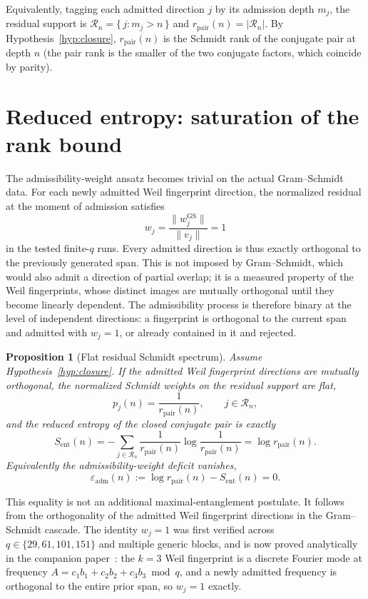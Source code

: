 \documentclass[11pt]{article}
\newtheorem{proposition}{Proposition}
\newcommand{\Sent}{S_{\mathrm{ent}}}
\newcommand{\rpair}{r_{\mathrm{pair}}}
\newcommand{\Rset}{\mathcal{R}}
\begin{document}
    Equivalently, tagging each admitted direction $j$ by its admission depth $m_j$, the residual support is
    $\Rset_n=\{\,j:m_j>n\,\}$ and $\rpair(n)=|\Rset_n|$.
    By Hypothesis~\ref{hyp:closure}, $\rpair(n)$ is the Schmidt rank of the conjugate pair at depth $n$ (the
    pair rank is the smaller of the two conjugate factors, which coincide by parity).

  \section{Reduced entropy: saturation of the rank bound}
    \label{sec:entropy}

    The admissibility-weight ansatz becomes trivial on the actual Gram--Schmidt data.
    For each newly admitted Weil fingerprint direction, the normalized residual at the moment of admission
    satisfies
    \[
      w_j=\frac{\|w_j^{\mathrm{GS}}\|}{\|v_j\|}=1
    \]
    in the tested finite-$q$ runs.
    Every admitted direction is thus exactly orthogonal to the previously generated span.
    This is not imposed by Gram--Schmidt, which would also admit a direction of partial overlap;
    it is a measured property of the Weil fingerprints, whose distinct images are mutually orthogonal until
    they become linearly dependent.
    The admissibility process is therefore binary at the level of independent directions:
    a fingerprint is orthogonal to the current span and admitted with $w_j=1$, or already contained in it and
    rejected.

    \begin{proposition}[Flat residual Schmidt spectrum]
      \label{prop:flat}
      Assume Hypothesis~\ref{hyp:closure}.
      If the admitted Weil fingerprint directions are mutually orthogonal, the normalized Schmidt weights on the
      residual support are flat,
      \[
        p_j(n)=\frac{1}{\rpair(n)},\qquad j\in\Rset_n,
      \]
      and the reduced entropy of the closed conjugate pair is exactly
      \[
        \Sent(n)
        =-\sum_{j\in\Rset_n}\frac{1}{\rpair(n)}\log\frac{1}{\rpair(n)}
        =\log \rpair(n).
      \]
      Equivalently the admissibility-weight deficit vanishes,
      \[
        \varepsilon_{\mathrm{adm}}(n):=\log \rpair(n)-\Sent(n)=0.
      \]
    \end{proposition}

    This equality is not an additional maximal-entanglement postulate.
    It follows from the orthogonality of the admitted Weil fingerprint directions in the Gram--Schmidt
    cascade.
    The identity $w_j=1$ was first verified across $q\in\{29,61,101,151\}$ and multiple generic blocks, and is
    now proved analytically in the companion paper~\cite{Beau2026ent1}: the $k{=}3$ Weil fingerprint is a
    discrete Fourier mode at frequency $A=c_1b_1+c_2b_2+c_3b_3 \bmod q$, and a newly admitted frequency is
    orthogonal to the entire prior span, so $w_j=1$ exactly.
\end{document}
